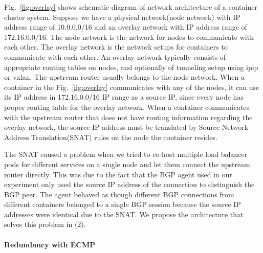 Fig.~\ref{fig:overlay} shows schematic diagram of network architecture of a container cluster system. 
Suppose we have a physical network(node network) with IP address range of 10.0.0.0/16 and an overlay network with IP address range of 172.16.0.0/16.
The node network is the network for nodes to communicate with each other.
The overlay network is the network setups for containers to communicate with each other.
An overlay network typically consists of appropriate routing tables on nodes, and optionally of tunneling setup using ipip or vxlan.
The upstream router usually belongs to the node network.
When a container in the Fig.~\ref{fig:overlay} communicates with any of the nodes, it can use its IP address in 172.16.0.0/16 IP range as a source IP, since every node has proper routing table for the overlay network.
When a container communicates with the upstream router that does not have routing information regarding the overlay network, the source IP address must be translated by Source Network Address Translation(SNAT) rules on the node the container resides.

The SNAT caused a problem when we tried to co-host multiple load balancer pods for different services on a single node and let them connect the upstream router directly.
This was due to the fact that the BGP agent used in our experiment only used the source IP address of the connection to distinguish the BGP peer.
The agent behaved as though different BGP connections from different containers belonged to a single BGP session because the source IP addresses were identical due to the SNAT.
We propose the architecture that solves this problem in (2).

\paragraph{\bf Redundancy with ECMP}\label{Redundancy with ECMP}

